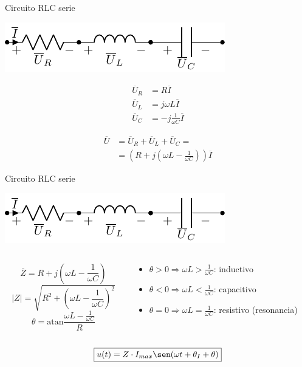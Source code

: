 \documentclass[aspectratio=169, usenames,svgnames,dvipsnames]{beamer}
\newcommand{\atan}{\mathrm{atan}}
\begin{document}
\begin{frame}[label={sec:org3ac73b4}]{Circuito RLC serie}
\begin{center}
\includegraphics[height=0.2\textheight]{../figs/RLC.pdf}
\end{center}

\begin{align*}
  \overline{U}_R &= R \overline{I}\\
  \overline{U}_L &= j\omega L \overline{I}\\
  \overline{U}_C &= -j \frac{1}{\omega C} \overline{I}
\end{align*}

\begin{align*}
  \overline{U} &= \overline{U}_R + \overline{U}_L + \overline{U}_C =\\
               &= \left(R + j(\omega L - \frac{1}{\omega C})\right) \overline{I} 
\end{align*}
\end{frame}

\begin{frame}[label={sec:orgf51b1bd}]{Circuito RLC serie}
\begin{center}
\includegraphics[height=0.2\textheight]{../figs/RLC.pdf}
\end{center}

\begin{columns}
\begin{column}{0.4\columnwidth}
\[
\overline{Z} = R + j(\omega L - \frac{1}{\omega C})
\]
\[
  |Z| = \sqrt{R^2 + (\omega L - \frac{1}{\omega C})^2}
\]
\[
  \theta = \atan{\frac{\omega L - \frac{1}{\omega C}}{R}}
\]
\end{column}

\begin{column}{0.6\columnwidth}
\begin{itemize}
\item \(\theta > 0 \Rightarrow \omega L > \frac{1}{\omega C}\): inductivo
\item \(\theta < 0 \Rightarrow \omega L < \frac{1}{\omega C}\): capacitivo
\item \(\theta = 0 \Rightarrow \omega L = \frac{1}{\omega C}\): resistivo (resonancia)
\end{itemize}
\end{column}
\end{columns}

\[
\boxed{u(t) = Z \cdot I_{max} \sen(\omega t + \theta_I + \theta)}
\]
\end{frame}
\end{document}
